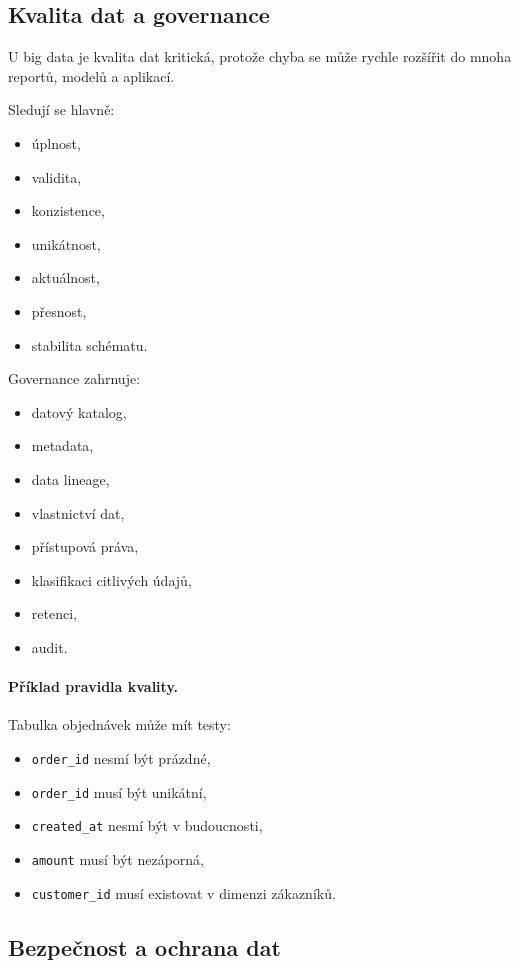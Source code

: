 \subsection{Kvalita dat a governance}

U big data je kvalita dat kritická, protože chyba se může rychle rozšířit do mnoha reportů, modelů a
aplikací.

Sledují se hlavně:
\begin{itemize}
    \item úplnost,
    \item validita,
    \item konzistence,
    \item unikátnost,
    \item aktuálnost,
    \item přesnost,
    \item stabilita schématu.
\end{itemize}

Governance zahrnuje:
\begin{itemize}
    \item datový katalog,
    \item metadata,
    \item data lineage,
    \item vlastnictví dat,
    \item přístupová práva,
    \item klasifikaci citlivých údajů,
    \item retenci,
    \item audit.
\end{itemize}

\paragraph{Příklad pravidla kvality.}
Tabulka objednávek může mít testy:
\begin{itemize}
    \item \texttt{order\_id} nesmí být prázdné,
    \item \texttt{order\_id} musí být unikátní,
    \item \texttt{created\_at} nesmí být v budoucnosti,
    \item \texttt{amount} musí být nezáporná,
    \item \texttt{customer\_id} musí existovat v dimenzi zákazníků.
\end{itemize}

\subsection{Bezpečnost a ochrana dat}


